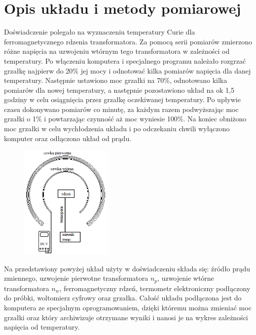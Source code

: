 \documentclass[a4paper,10pt]{article}
\begin{document}
\section{Opis układu i metody pomiarowej}
Doświadczenie polegało na wyznaczeniu temperatury Curie dla ferromagnetycznego rdzenia transformatora. Za pomocą serii pomiarów zmierzono różne napięcia na uzwojeniu wtórnym tego transformatora w zależności od temperatury. Po włączeniu komputera i specjalnego programu należało rozgrzać grzałkę najpierw do 20\% jej mocy i odnotować kilka pomiarów napięcia dla danej temperatury. Następnie ustawiono moc grzałki na 70\%, odnotowano kilka pomiarów dla nowej temperatury, a następnie pozostawiono układ na ok 1,5 godziny w celu osiągnięcia przez grzałkę oczekiwanej temperatury. Po upływie czasu dokonywano pomiarów co minutę, za każdym razem podwyższając moc grzałki o 1\% i powtarzając czynność aż moc wyniesie 100\%. Na koniec obniżono moc grzałki w celu wychłodzenia układu i po odczekaniu chwili wyłączono komputer oraz odłączono układ od prądu.
\begin{figure}[H]
\center
\includegraphics[width=0.4\textwidth]{uklad.png}
\end{figure}
Na przedstawiony powyżej układ użyty w doświadczeniu składa się: źródło prądu zmiennego, uzwojenie pierwotne transformatora $n_p$, uzwojenie wtórne transformatora $n_w$, ferromagnetyczny rdzeń, termometr elektroniczny podłączony do próbki, woltomierz cyfrowy oraz grzałka. Całość układu podłączona jest do komputera ze specjalnym oprogramowaniem, dzięki któremu można zmieniać moc grzałki oraz który archiwizuje otrzymane wyniki i nanosi je na wykres zależności napięcia od temperatury.
\\\\\\\\\\\\\\
\end{document}
